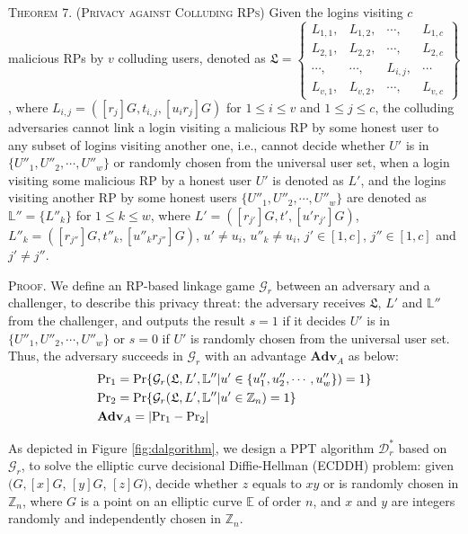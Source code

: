 \vspace{3mm}
\noindent \textsc{Theorem 7. (Privacy against Colluding RPs)} { Given
    the logins visiting $c$ malicious RPs by $v$ colluding users, denoted as
 $\mathfrak{L}=\left \{ \begin{matrix}
L_{1,1},&L_{1,2},&\cdots,&L_{1,c}\\
L_{2,1},& L_{2,2},&\cdots,&L_{2,c}\\
\cdots,&\cdots,&L_{i,j},&\cdots\\
L_{v,1},&L_{v,2},&\cdots,&L_{v,c}
\end{matrix}\right\}$, where
 $L_{i, j}=([r_j]G, t_{i,j}, [u_ir_j]G)$ for $1 \le i \le v$ and $1 \le j \le c$,
the colluding adversaries cannot link a login visiting a malicious RP by some honest user
    to any subset of logins visiting another one,
  i.e., cannot decide whether $U'$ is in $\{{U''_1}, {U''_2}, \cdots, {U''_w}\}$ or randomly chosen from the universal user set,
    when a login visiting some malicious RP by a honest user $U'$ is denoted as $L'$,
     and the logins visiting another RP by some honest users $\{{U''_1}, {U''_2}, \cdots, {U''_w}\}$ are denoted as $\mathbb{L}'' = \{L''_k\}$ for $1 \leq k \leq w$,
     where $L' = ([r_{j'}]G, t', [u'r_{j'}]G)$, $L''_k = ([r_{j''}]G, t''_k, [u''_kr_{j''}]G)$, $u' \neq u_i$, $u''_k \neq u_i$,
     $j' \in [1,c]$, $j'' \in [1,c]$ and $j' \neq j''$.}

\vspace{0.75mm}
\noindent\textsc{Proof.}
We define an RP-based linkage game $\mathcal{G}_r$ between an adversary and a challenger,
    to describe this privacy threat:
 the adversary receives $\mathfrak{L}$, $L'$ and $\mathbb{L}''$ from the challenger,
 and outputs the result $s = 1$ if it decides $U'$ is in $\{{U''_1}, {U''_2}, \cdots, {U''_w}\}$
  or $s=0$ if $U'$ is randomly chosen from the universal user set.
Thus, the adversary succeeds in $\mathcal{G}_r$ with an advantage $\mathbf{Adv}_{A}$ as below:
\begin{align*}
&{\rm Pr}_1={\rm Pr}\{\mathcal{G}_r(\mathfrak{L}, L', \mathbb{L}'' | u' \in \{{u''_1}, {u''_2}, \cdots, {u''_w}\})=1\} \\
&{\rm Pr}_2={\rm Pr}\{\mathcal{G}_r(\mathfrak{L}, L', \mathbb{L}'' | u' \in \mathbb{Z}_n)=1\}\\
&{\mathbf{Adv}}_{A}=|{\rm Pr}_1-{\rm Pr}_2|
\end{align*}

As depicted in Figure \ref{fig:dalgorithm},
    we design a PPT algorithm $\mathcal{D}^*_r$ based on $\mathcal{G}_r$,
     to solve the elliptic curve decisional Diffie-Hellman (ECDDH) problem:
 given $(G, [x]G$, $[y]G$, $[z]G)$, decide whether $z$ equals to $xy$ or is randomly chosen in $\mathbb{Z}_n$,
    where $G$ is a point on an elliptic curve $\mathbb{E}$ of order $n$, and $x$ and $y$ are integers randomly and independently chosen in $\mathbb{Z}_n$.

